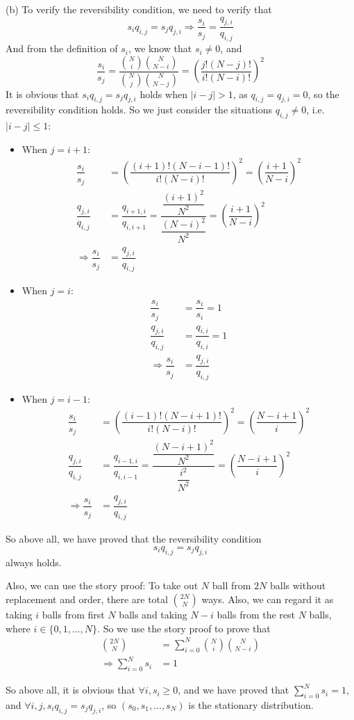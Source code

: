\begin{homeworkProblem}
(b) To verify the reversibility condition, we need to verify that
$$s_iq_{i,j} = s_jq_{j,i} \Rightarrow \dfrac{s_i}{s_j} = \dfrac{q_{j,i}}{q_{i,j}}$$
And from the definition of $s_i$, we know that $s_i\neq 0$, and
$$\dfrac{s_i}{s_j} = \dfrac{\binom{N}{i}\binom{N}{N-i}}{\binom{N}{j}\binom{N}{N-j}} = \left(\dfrac{j!(N-j)!}{i!(N-i)!}\right)^2$$
It is obvious that $s_iq_{i,j} = s_jq_{j,i}$ holds when $|i-j|>1$, as $q_{i,j}=q_{j,i}=0$, so the reversibility condition holds. So we just consider the situations $q_{i,j}\neq 0$, i.e. $|i-j|\leq 1$:
\begin{itemize}
\item When $j=i+1$:
\begin{align*}
\dfrac{s_i}{s_j} &= \left(\dfrac{(i+1)!(N-i-1)!}{i!(N-i)!}\right)^2=\left(\dfrac{i+1}{N-i}\right)^2 \\
\dfrac{q_{j,i}}{q_{i,j}} &= \dfrac{q_{i+1,i}}{q_{i,i+1}}=\dfrac{\dfrac{(i+1)^2}{N^2}}{\dfrac{(N-i)^2}{N^2}}=\left(\dfrac{i+1}{N-i}\right)^2 \\
\Rightarrow \dfrac{s_i}{s_j} &= \dfrac{q_{j,i}}{q_{i,j}}
\end{align*}

\item When $j=i$:
\begin{align*}
\dfrac{s_i}{s_j} &= \dfrac{s_i}{s_i} = 1 \\
\dfrac{q_{j,i}}{q_{i,j}} &= \dfrac{q_{i,i}}{q_{i,i}}=1 \\
\Rightarrow \dfrac{s_i}{s_j} &= \dfrac{q_{j,i}}{q_{i,j}}
\end{align*}

\item When $j=i-1$:
\begin{align*}
\dfrac{s_i}{s_j} &= \left(\dfrac{(i-1)!(N-i+1)!}{i!(N-i)!}\right)^2=\left(\dfrac{N-i+1}{i}\right)^2 \\
\dfrac{q_{j,i}}{q_{i,j}} &= \dfrac{q_{i-1,i}}{q_{i,i-1}}=\dfrac{\dfrac{(N-i+1)^2}{N^2}}{\dfrac{i^2}{N^2}}=\left(\dfrac{N-i+1}{i}\right)^2 \\
\Rightarrow \dfrac{s_i}{s_j} &= \dfrac{q_{j,i}}{q_{i,j}}
\end{align*}
\end{itemize}

So above all, we have proved that the reversibility condition
$$s_iq_{i,j} = s_jq_{j,i}$$
always holds.

Also, we can use the story proof: To take out $N$ ball from $2N$ balls without replacement and order, there are total $\binom{2N}{N}$ ways. Also, we can regard it as taking $i$ balls from first $N$ balls and taking $N-i$ balls from the rest $N$ balls, where $i\in\{0,1,\ldots,N\}$. So we use the story proof to prove that
\begin{align*}
\binom{2N}{N} &= \sum_{i=0}^N \binom{N}{i}\binom{N}{N-i} \\
\Rightarrow \sum_{i=0}^N s_i &= 1
\end{align*}

So above all, it is obvious that $\forall i, s_i\geq 0$, and we have proved that $\sum\limits_{i=0}^N s_i = 1$, and $\forall i,j, s_iq_{i,j} = s_jq_{j,i}$, so $\left(s_0, s_1, \ldots, s_N\right)$ is the stationary distribution.

\end{homeworkProblem}

\newpage